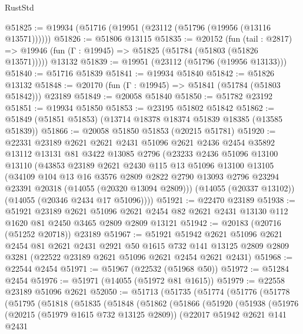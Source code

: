\begin{lexlean}{RustStd}
\begin{coremodule}
@51825 := @19934 (@51716 (@19951 (@23112 (@51796 (@19956 (@13116 @13571))))))
@51826 := @51806 @13115
@51835 := @20152
    (fun (tail : @2817) => @19946 (fun (Γ : @19945) => @51825 (@51784 (@51803 (@51826 @13571)))))
    @13132
@51839 := @19951 (@23112 (@51796 (@19956 @13133)))
@51840 := @51716 @51839
@51841 := @19934 @51840
@51842 := @51826 @13132
@51848 := @20170 (fun (Γ : @19945) => @51841 (@51784 (@51803 @51842))) @23189
@51849 := @20058 @51840
@51850 := @51782 @23192
@51851 := @19934 @51850
@51853 := @23195 @51802 @51842
@51862 := @51849 (@51851 @51853) (@13714 @18378 @18374 @51839 @18385 (@13585 @51839))
@51866 := @20058 @51850 @51853 (@20215 @51781)
@51920 := @22331
    @23189
    @2621
    @2621
    @2431
    @51096
    @2621
    @2436
    @2454
    @35892
    @13112
    @13131
    @81
    @3422
    @13085
    @2796
    (@23233
      @2436
      @51096
      @13100
      @13110
      (@43853
        @23189
        @2621
        @2430
        @115
        @13
        @51096
        @13100
        @13105
        (@34109
          @104
          @13
          @16
          @3576
          @2809
          @2822
          @2790
          @13093
          @2796
          @23294
          @23391
          @20318
          (@14055 (@20320 @13094 @2809)))
        (@14055 (@20337 @13102))
        (@14055 (@20346 @2434 @17 @51096))))
@51921 := @22470 @23189
@51938 := @51921
    @23189
    @2621
    @51096
    @2621
    @2454
    @82
    @2621
    @2431
    @13130
    @112
    @1620
    @81
    @2450
    @3465
    @2809
    @2809
    @13121
@51942 := @20183 (@20716 (@51252 @20718)) @23189
@51967 := @51921
    @51942
    @2621
    @51096
    @2621
    @2454
    @81
    @2621
    @2431
    @2921
    @50
    @1615
    @732
    @141
    @13125
    @2809
    @2809
    @3281
    (@22522 @23189 @2621 @51096 @2621 @2454 @2621 @2431)
@51968 := @22544 @2454
@51971 := @51967 (@22532 (@51968 @50))
@51972 := @51284 @2454
@51976 := @51971 (@14055 (@51972 @81 @1615))
@51979 := @22558 @23189 @51096 @2621
@52050 := @51713
    (@51735
      (@51774
        (@51776
          (@51778
            (@51795
              (@51818
                (@51835
                  (@51848
                    (@51862
                      (@51866
                        (@51920
                          (@51938
                            (@51976
                              (@20215 (@51979 @1615 @732 @13125 @2809))
                              (@22017
                                @51942
                                @2621
                                @141
                                @2431

\end{coremodule}
\end{lexlean}
